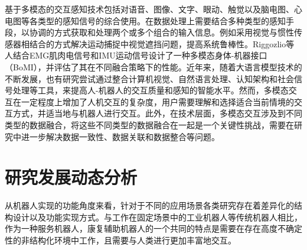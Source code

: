 基于多模态的交互感知技术包括对语音、图像、文字、眼动、触觉以及脑电图、心电图等各类型的感知信号的综合使用\cite{suRecentAdvancementsMultimodal2023}。在数据处理上需要结合多种类型的感知手段，以协调的方式获取和处理两个或多个组合的输入信息。例如采用视觉与惯性传感器相结合的方式解决运动捕捉中视觉遮挡问题\cite{mallesonRealTimeFullBodyMotion2017,moniruzzamanWearableMotionCapture2023}，提高系统鲁棒性。Riggozlio等人\cite{rizzoglioHybridBodyMachineInterface2020}结合EMG肌肉电信号和IMU运动信号设计了一种多模态身体-机器接口（BoMI），并评估了其在不同融合策略下的性能。近年来，随着大语言模型技术的不断发展，也有研究尝试通过整合计算机视觉、自然语言处理、认知架构和社会信号处理等工具，来提高人-机器人的交互质量和感知的智能水平\cite{dongHuBoVLMUnifiedVisionLanguage2023,huangVoxPoserComposable3D2023,gaoPhysicallyGroundedVisionLanguage2023}。然而，多模态交互在一定程度上增加了人机交互的复杂度，用户需要理解和选择适合当前情境的交互方式，并适当地与机器人进行交互。此外，在技术层面，多模态交互涉及到不同类型的数据融合，将这些不同类型的数据融合在一起是一个关键性挑战，需要在研究中进一步解决数据一致性、数据关联和数据整合等问题。

\section{研究发展动态分析}
从机器人实现的功能角度来看，针对于不同的应用场景各类研究存在着差异化的结构设计以及功能实现方式。与工作在固定场景中的工业机器人等传统机器人相比，作为一种服务机器人，康复辅助机器人的一个共同的特点是需要在存在高度不确定性的非结构化环境中工作，且需要与人类进行更加丰富地交互。

